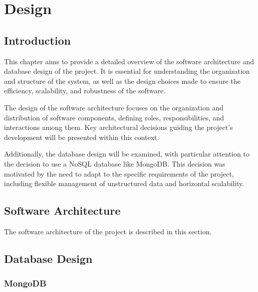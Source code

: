 \chapter{Design}

\section{Introduction}
This chapter aims to provide a detailed overview of the software architecture and database design of the project. It is essential for understanding the organization and structure of the system, as well as the design choices made to ensure the efficiency, scalability, and robustness of the software.

The design of the software architecture focuses on the organization and distribution of software components, defining roles, responsibilities, and interactions among them. Key architectural decisions guiding the project's development will be presented within this context.

Additionally, the database design will be examined, with particular attention to the decision to use a NoSQL database like MongoDB. This decision was motivated by the need to adapt to the specific requirements of the project, including flexible management of unstructured data and horizontal scalability.


\section{Software Architecture}

The software architecture of the project is described in this section.

\newpage
\section{Database Design}

\subsection{MongoDB}
